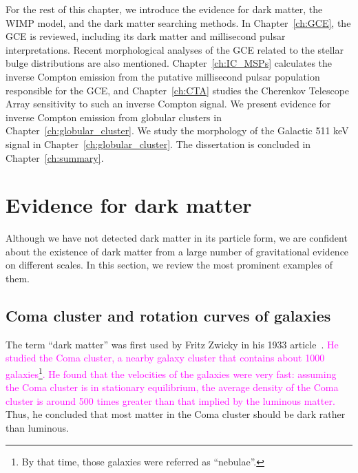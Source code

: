 \documentclass[doublespace,nopageskip]{VTthesis} %
\newcommand{\DS}[1]{\textcolor{magenta}{#1}}
\begin{document}
For the rest of this chapter, we introduce the evidence for dark matter, the WIMP model, and the dark matter searching methods. In Chapter~\ref{ch:GCE}, the GCE is reviewed, including its dark matter and millisecond pulsar interpretations. Recent morphological analyses of the GCE related to the stellar bulge distributions are also mentioned. Chapter~\ref{ch:IC_MSPs} calculates the inverse Compton emission from the putative millisecond pulsar population responsible for the GCE, and Chapter~\ref{ch:CTA} studies the Cherenkov Telescope Array sensitivity to such an inverse Compton signal. We present evidence for inverse Compton emission from globular clusters in Chapter~\ref{ch:globular_cluster}. We study the morphology of the Galactic 511 keV signal in Chapter~\ref{ch:globular_cluster}. The dissertation is concluded in Chapter~\ref{ch:summary}.

\section{Evidence for dark matter} \label{se:one_section}

Although we have not detected dark matter in its particle form, we are confident about the existence of dark matter from a large number of gravitational evidence on different scales. In this section, we review the most prominent examples of them.

\subsection{Coma cluster and rotation curves of galaxies} \label{sse:rotation_curve}

The term ``dark matter'' was first used by Fritz Zwicky in his 1933 article~\cite{1933AcHPh...6..110Z}. \DS{He studied the Coma cluster, a nearby galaxy cluster that contains about 1000 galaxies\footnote{By that time, those galaxies were referred as ``nebulae''.}. He found that the velocities of the galaxies were very fast: assuming the Coma cluster is in stationary equilibrium, the average density of the Coma cluster is around 500 times greater than that implied by the luminous matter.} Thus, he concluded that most matter in the Coma cluster should be dark rather than luminous.

\end{document}
